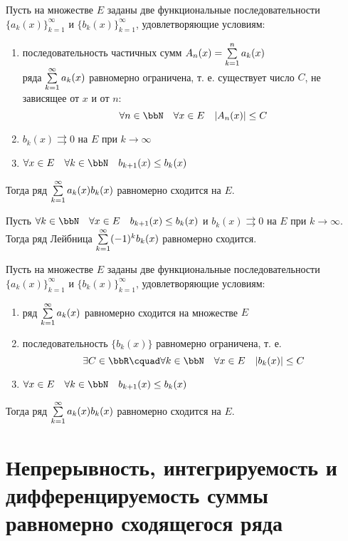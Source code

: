 \begin{thm}
	Пусть на множестве $E$ заданы две функциональные последовательности
	$\{a_k(x)\}_{k=1}^\infty$ и $\{b_k(x)\}_{k=1}^\infty$, удовлетворяющие условиям:
	\begin{enumerate}
		\item последовательность частичных сумм $A_n(x) = \sum_{k=1}^{n}\limits a_k(x)$\\
			ряда $\sum_{k=1}^{\infty}\limits a_k(x)$ равномерно ограничена, т. е.
			существует число $C$, не зависящее от $x$ и от $n$:
			$$
				\forall n \in \bbN \quad \forall x \in E \quad |A_n(x)| \le C
			$$
		\item $b_k(x) \rightrightarrows 0$ на $E$ при $k \to \infty$
		\item $\forall x \in E \quad \forall k \in \bbN \quad b_{k+1}(x) \le b_k(x)$
	\end{enumerate}
	Тогда ряд $\sum_{k=1}^{\infty}\limits a_k(x)b_k(x)$ равномерно сходится на $E$.
\end{thm}

\begin{thm}
	Пусть $\forall k \in \bbN \quad \forall x \in E \quad b_{k+1}(x) \le b_k(x)$
	и $b_k(x) \rightrightarrows 0$ на $E$ при $k \to \infty$. Тогда ряд Лейбница
	$\sum_{k=1}^{\infty}\limits (-1)^k b_k(x)$ равномерно сходится.
\end{thm}

\begin{thm}
	Пусть на множестве $E$ заданы две функциональные последовательности
	$\{a_k(x)\}_{k=1}^\infty$ и $\{b_k(x)\}_{k=1}^\infty$, удовлетворяющие условиям:
	\begin{enumerate}
		\item ряд $\sum_{k=1}^{\infty}\limits a_k(x)$ равномерно сходится на множестве $E$
		\item последовательность $\{b_k(x)\}$ равномерно ограничена, т. е.
			$$
				\exists C \in \bbR \cquad \forall k \in \bbN \quad \forall x \in E
					\quad |b_k(x)| \le C
			$$
		\item $\forall x \in E \quad \forall k \in \bbN \quad b_{k+1}(x) \le b_k(x)$
	\end{enumerate}
	Тогда ряд $\sum_{k=1}^{\infty}\limits a_k(x)b_k(x)$ равномерно сходится на $E$.
\end{thm}


\section{Непрерывность, интегрируемость и дифференцируемость суммы равномерно сходящегося ряда}

